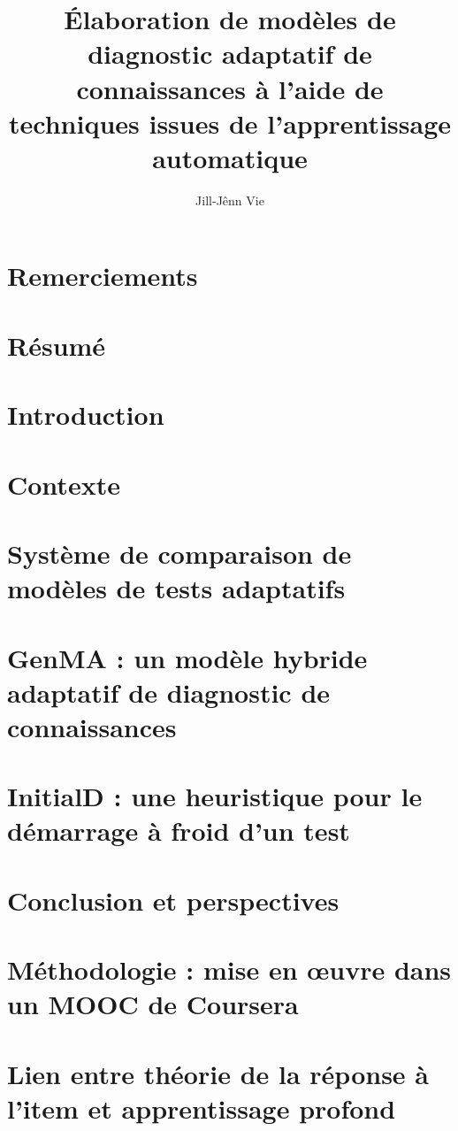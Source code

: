 \documentclass[a4paper,12pt]{memoir}
\title{Élaboration de modèles de diagnostic adaptatif de connaissances à l'aide de techniques issues de l'apprentissage automatique}
\author{Jill-Jênn Vie}
\begin{document}
\maketitle

\chapter*{Remerciements}


\printnomenclature

\chapter*{Résumé}


\clearpage
\tableofcontents*

\chapter{Introduction}


\chapter{Contexte}


\chapter{Système de comparaison de modèles de tests adaptatifs}



\chapter{GenMA : un modèle hybride adaptatif de diagnostic de connaissances}




\chapter{InitialD : une heuristique pour le démarrage à froid d'un test}




\chapter{Conclusion et perspectives}


\appendix

\chapter{Méthodologie : mise en œuvre dans un MOOC de Coursera}



\chapter{Lien entre théorie de la réponse à l'item et apprentissage profond}


\nocite{*}
\printbibliography
\end{document}
